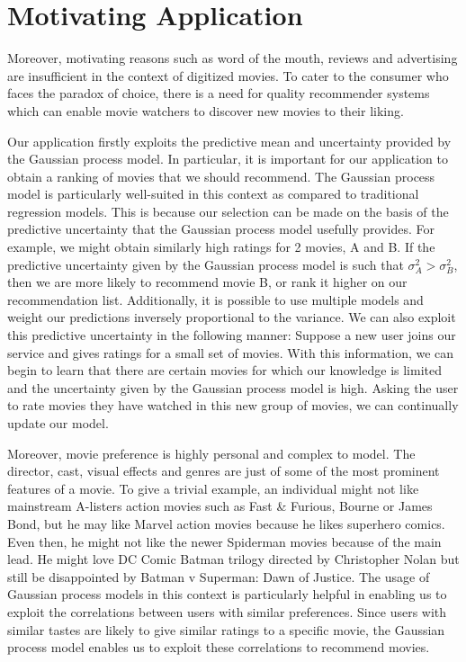 \documentclass[letterpaper]{article}
\begin{document}
\section{Motivating Application}
Moreover, motivating reasons such as word of the mouth, reviews and advertising are insufficient in the context of digitized movies. To cater to the consumer who faces the paradox of choice, there is a need for quality recommender systems which can enable movie watchers to discover new movies to their liking.

Our application firstly exploits the predictive mean and uncertainty provided by the Gaussian process model.
In particular, it is important for our application to obtain a ranking of movies that we should recommend.
The Gaussian process model is particularly well-suited in this context as compared to traditional regression models.
This is because our selection can be made on the basis of the predictive uncertainty that the Gaussian process model usefully provides.
For example, we might obtain similarly high ratings for 2 movies, A and B. If the predictive uncertainty given by the Gaussian process model is such that $\sigma_A^2 > \sigma_B^2$, then we are more likely to recommend movie B, or rank it higher on our recommendation list.
Additionally, it is possible to use multiple models and weight our predictions inversely proportional to the variance.
We can also exploit this predictive uncertainty in the following manner: Suppose a new user joins our service and gives ratings for a small set of movies.
With this information, we can begin to learn that there are certain movies for which our knowledge is limited and the uncertainty given by the Gaussian process model is high.
Asking the user to rate movies they have watched in this new group of movies, we can continually update our model.

Moreover, movie preference is highly personal and complex to model.
The director, cast, visual effects and genres are just of some of the most prominent features of a movie.
To give a trivial example, an individual might not like mainstream A-listers action movies such as Fast \& Furious, Bourne or James Bond, but he may like Marvel action movies because he likes superhero comics.
Even then, he might not like the newer Spiderman movies because of the main lead. He might love DC Comic Batman trilogy directed by Christopher Nolan but still be disappointed by Batman v Superman: Dawn of Justice.
The usage of Gaussian process models in this context is particularly helpful in enabling us to exploit the correlations between users with similar preferences.
Since users with similar tastes are likely to give similar ratings to a specific movie, the Gaussian process model enables us to exploit these correlations to recommend movies.
\end{document}
